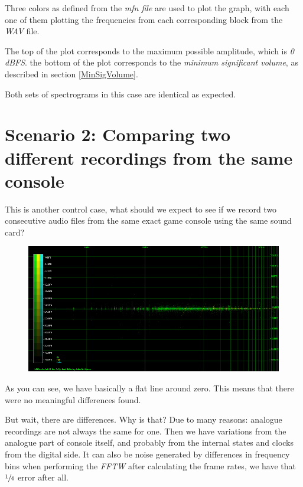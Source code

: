 \documentclass[10pt,a4paper]{report}
\begin{document}
Three colors as defined from the \textit{mfn file} are used to plot the graph, with each one of them plotting the frequencies from each corresponding block from the \textit{WAV} file.

The top of the plot corresponds to the maximum possible amplitude, which is \textit{0 dBFS}. the bottom of the plot corresponds to the \textit{minimum significant volume}, as described in section \ref{MinSigVolume}.

Both sets of spectrograms in this case are identical as expected. 

\section{Scenario 2: Comparing two different recordings from the same console}

This is another control case, what should we expect to see if we record two consecutive audio files from the same exact game console using the same sound card?

\begin{figure}[H]
	\centering
	\includegraphics[width=1\linewidth]{plots/Plot2-Sameconsole.png}
	\caption{}
	\label{fig:plot2-sameconsole}
\end{figure}

As you can see, we have basically a flat line around zero. This means that there were no meaningful differences found. 

But wait, there are differences. Why is that? Due to many reasons: analogue recordings are not always the same for one. Then we have variations from the analogue part of console itself, and probably from the internal states and clocks from the digital side. It can also be noise generated by differences in frequency bins when performing the \textit{FFTW} after calculating the frame rates, we have that $\sfrac{1}{4}$ error after all.
\end{document}
